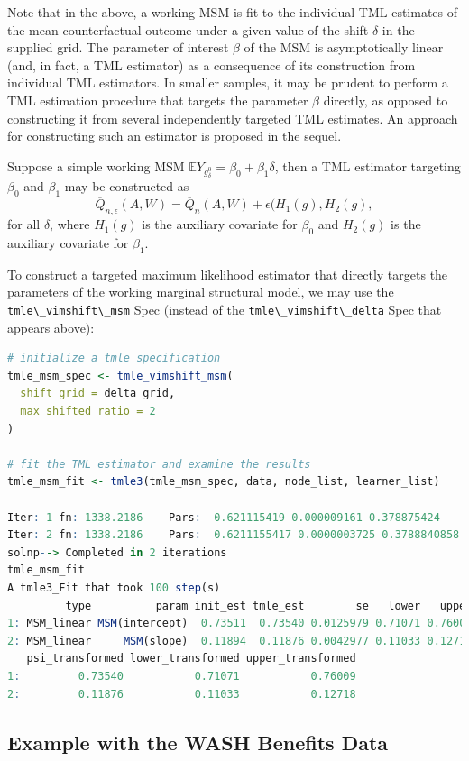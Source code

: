 \documentclass[
  12pt, krantz2,
]{book}
\newcommand{\passthrough}[1]{#1}
\theoremstyle{definition}
\theoremstyle{definition}
\theoremstyle{definition}
\newcommand{\1}{\mathbbm{1}}
\begin{document}
Note that in the above, a working MSM is fit to the individual TML estimates of
the mean counterfactual outcome under a given value of the shift \(\delta\) in
the supplied grid. The parameter of interest \(\beta\) of the MSM is
asymptotically linear (and, in fact, a TML estimator) as a consequence of its
construction from individual TML estimators. In smaller samples, it may be
prudent to perform a TML estimation procedure that targets the parameter
\(\beta\) directly, as opposed to constructing it from several independently
targeted TML estimates. An approach for constructing such an estimator is
proposed in the sequel.

Suppose a simple working MSM \(\mathbb{E}Y_{g^0_{\delta}} = \beta_0 + \beta_1 \delta\), then a TML estimator targeting \(\beta_0\) and \(\beta_1\) may be
constructed as
\[\overline{Q}_{n, \epsilon}(A,W) = \overline{Q}_n(A,W) + \epsilon (H_1(g),
H_2(g),\] for all \(\delta\), where \(H_1(g)\) is the auxiliary covariate for
\(\beta_0\) and \(H_2(g)\) is the auxiliary covariate for \(\beta_1\).

To construct a targeted maximum likelihood estimator that directly targets the
parameters of the working marginal structural model, we may use the
\passthrough{\lstinline!tmle\_vimshift\_msm!} Spec (instead of the \passthrough{\lstinline!tmle\_vimshift\_delta!} Spec that
appears above):

\begin{lstlisting}[language=R]
# initialize a tmle specification
tmle_msm_spec <- tmle_vimshift_msm(
  shift_grid = delta_grid,
  max_shifted_ratio = 2
)

# fit the TML estimator and examine the results
tmle_msm_fit <- tmle3(tmle_msm_spec, data, node_list, learner_list)

Iter: 1 fn: 1338.2186    Pars:  0.621115419 0.000009161 0.378875424
Iter: 2 fn: 1338.2186    Pars:  0.6211155417 0.0000003725 0.3788840858
solnp--> Completed in 2 iterations
tmle_msm_fit
A tmle3_Fit that took 100 step(s)
         type          param init_est tmle_est        se   lower   upper
1: MSM_linear MSM(intercept)  0.73511  0.73540 0.0125979 0.71071 0.76009
2: MSM_linear     MSM(slope)  0.11894  0.11876 0.0042977 0.11033 0.12718
   psi_transformed lower_transformed upper_transformed
1:         0.73540           0.71071           0.76009
2:         0.11876           0.11033           0.12718
\end{lstlisting}

\hypertarget{example-with-the-wash-benefits-data}{%
\subsection{Example with the WASH Benefits Data}\label{example-with-the-wash-benefits-data}}
\end{document}
